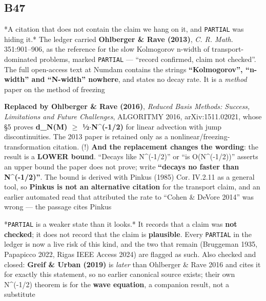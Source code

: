 \documentclass[10pt]{article}
\begin{document}
\subsection*{B47}\label{led:B47}
\begin{description}[leftmargin=0pt,itemsep=1pt]
\item[Defect.] *A citation that does not contain the claim we hang on it, and \texttt{PARTIAL} was hiding it.* The ledger carried \textbf{Ohlberger \& Rave (2013)}, \emph{C. R. Math.} 351:901--906, as the reference for the slow Kolmogorov n-width of transport-dominated problems, marked \texttt{PARTIAL} --- ``record confirmed, claim not checked''. The full open-access text at Numdam contains the strings \textbf{``Kolmogorov'', ``n-width'' and ``N-width'' nowhere}, and states no decay rate. It is a \emph{method} paper on the method of freezing
\item[Resolution.] \textbf{Replaced by Ohlberger \& Rave (2016)}, \emph{Reduced Basis Methods: Success, Limitations and Future Challenges}, ALGORITMY 2016, arXiv:1511.02021, whose §5 proves \textbf{d\_N(M) $\geq$ ½$\cdot$N\textasciicircum{}(-1/2)} for linear advection with jump discontinuities. The 2013 paper is retained only as a nonlinear/freezing-transformation citation. (!) \textbf{And the replacement changes the wording}: the result is a \textbf{LOWER bound}. ``Decays like N\textasciicircum{}(-1/2)'' or ``is O(N\textasciicircum{}(-1/2))'' asserts an upper bound the paper does not prove; write \textbf{``decays no faster than N\textasciicircum{}(-1/2)''}. The bound is derived with Pinkus (1985) Cor. IV.2.11 as a general tool, so \textbf{Pinkus is not an alternative citation} for the transport claim, and an earlier automated read that attributed the rate to ``Cohen \& DeVore 2014'' was wrong --- the passage cites Pinkus
\item[Note.] *\texttt{PARTIAL} is a weaker state than it looks.* It records that a claim was \textbf{not checked}; it does not record that the claim is \textbf{plausible}. Every \texttt{PARTIAL} in the ledger is now a live risk of this kind, and the two that remain (Bruggeman 1935, Papapicco 2022, Rigas IEEE Access 2024) are flagged as such. Also checked and closed: \textbf{Greif \& Urban (2019)} is \emph{later} than Ohlberger \& Rave 2016 and cites it for exactly this statement, so no earlier canonical source exists; their own N\textasciicircum{}(-1/2) theorem is for the \textbf{wave equation}, a companion result, not a substitute
\end{description}
\end{document}
